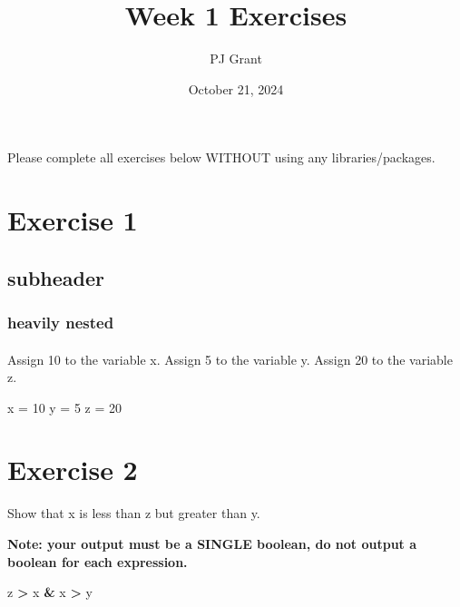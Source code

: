 \documentclass[
]{article}
\title{Week 1 Exercises}
\author{PJ Grant}
\date{October 21, 2024}
\newenvironment{Shaded}{\begin{snugshade}}{\end{snugshade}}
\newcommand{\DecValTok}[1]{\textcolor[rgb]{0.00,0.00,0.81}{#1}}
\newcommand{\NormalTok}[1]{#1}
\newcommand{\OtherTok}[1]{\textcolor[rgb]{0.56,0.35,0.01}{#1}}
\newcommand{\SpecialCharTok}[1]{\textcolor[rgb]{0.81,0.36,0.00}{\textbf{#1}}}
\begin{document}
\maketitle

Please complete all exercises below WITHOUT using any
libraries/packages.

\section{Exercise 1}\label{exercise-1}

\subsection{subheader}\label{subheader}

\subsubsection{heavily nested}\label{heavily-nested}

\paragraph{}\label{section}

Assign 10 to the variable x. Assign 5 to the variable y. Assign 20 to
the variable z.

\begin{Shaded}
\begin{Highlighting}[]
\NormalTok{x }\OtherTok{=} \DecValTok{10}
\NormalTok{y }\OtherTok{=} \DecValTok{5}
\NormalTok{z }\OtherTok{=} \DecValTok{20}
\end{Highlighting}
\end{Shaded}

\section{Exercise 2}\label{exercise-2}

Show that x is less than z but greater than y.

\textbf{Note: your output must be a SINGLE boolean, do not output a
boolean for each expression.}

\begin{Shaded}
\begin{Highlighting}[]
\NormalTok{z }\SpecialCharTok{\textgreater{}}\NormalTok{ x }\SpecialCharTok{\&}\NormalTok{ x }\SpecialCharTok{\textgreater{}}\NormalTok{ y}
\end{Highlighting}
\end{Shaded}
\end{document}
